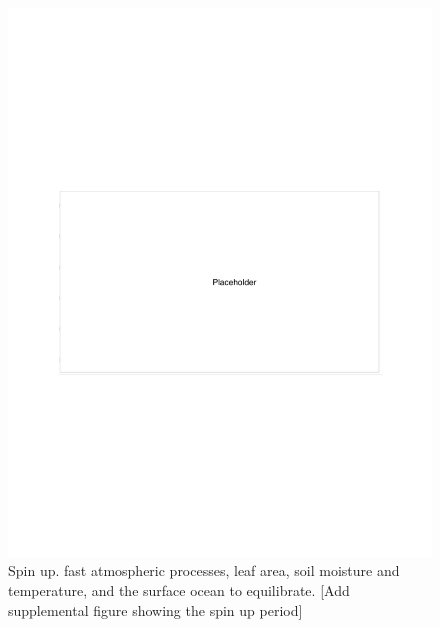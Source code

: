 \documentclass[draft,grl]{agutexSI2019}
\begin{document}
\begin{figure}[htb!]
\noindent\includegraphics[width=\textwidth]{writing/figs/placeholder.pdf}
\caption{Spin up. fast atmospheric processes, leaf area, soil moisture and temperature, and the surface ocean to equilibrate. [Add supplemental figure showing the spin up period]}
\label{fig:supp_spinup}
\end{figure}
\end{document}
